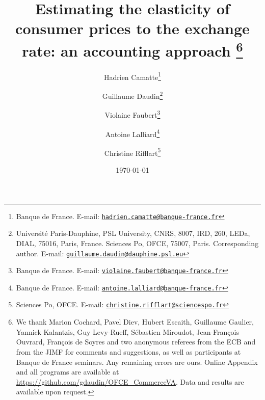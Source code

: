 \documentclass[11pt,a4paper]{paper} %
\newcommand{\email}[1]{\href{mailto:#1}{\nolinkurl{#1}}}
\begin{document}
\title{Estimating the elasticity of consumer prices to the exchange rate: an accounting approach	\thanks{We thank Marion Cochard, Pavel Diev, Hubert Escaith, Guillaume Gaulier, Yannick Kalantzis, Guy Levy-Rueff, Sébastien Miroudot, Jean-François Ouvrard, François de Soyres and two anonymous referees from the ECB and from the JIMF for comments and suggestions, as well as participants at Banque de France seminars. Any remaining errors are ours. Online Appendix and all programs are available at \url{https://github.com/gdaudin/OFCE_CommerceVA}. Data and results are available upon request.}\\
\vspace{1cm}
}
\vspace{1cm}
\date{\today}
\author{
	Hadrien Camatte\thanks{Banque de France. E-mail: \email{hadrien.camatte@banque-france.fr}}
	\and
	Guillaume Daudin\thanks{Université Paris-Dauphine, PSL University, CNRS, 8007, IRD, 260, LEDa, DIAL, 75016, Paris, France. Sciences Po, OFCE, 75007, Paris. Corresponding author. E-mail: \email{guillaume.daudin@dauphine.psl.eu}}
	\and
	Violaine Faubert\thanks{Banque de France. E-mail: \email{violaine.faubert@banque-france.fr}}
	\and
	Antoine Lalliard\thanks{Banque de France. E-mail: \email{antoine.lalliard@banque-france.fr}}
	\and
	Christine Rifflart\thanks{Sciences Po, OFCE. E-mail: \email{christine.rifflart@sciencespo.fr}}
}
\maketitle

\end{document}

